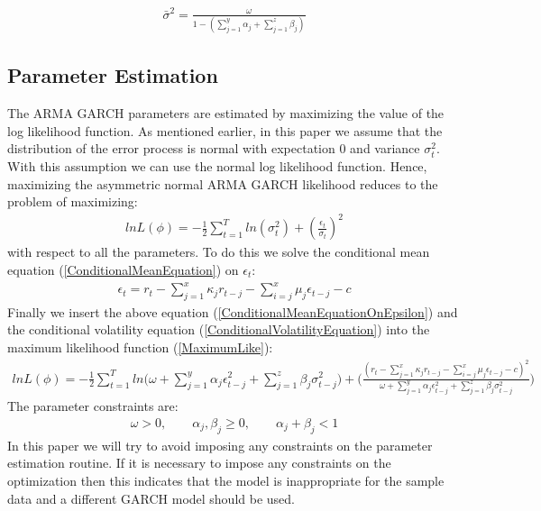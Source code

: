 \begin{align}
    \bar{\sigma}^2=\frac{\omega}{1-(\sum_{j=1}^y\alpha_j+\sum_{j=1}^z\beta_j)} \label{longTermVolatilityGARCH}
\end{align}

\subsection*{Parameter Estimation}

The ARMA GARCH parameters are estimated by maximizing the value of the log likelihood function. As mentioned earlier, in this paper we assume that the distribution of the error process is normal with expectation 0 and variance ${\sigma_t^2}$. With this assumption we can use the normal log likelihood function. Hence, maximizing the asymmetric normal ARMA GARCH likelihood reduces to the problem of maximizing:
\begin{align} 
    ln L(\phi)=-\frac{1}{2}\sum_{t=1}^T ln(\sigma_t^2)+(\frac{\epsilon_t}{\sigma_t})^2  \label{MaximumLike}
\end{align}
with respect to all the parameters. To do this we solve the conditional mean equation (\ref{ConditionalMeanEquation}) on $\epsilon_t$:
\begin{align}
    \epsilon_t=r_t-\sum_{j=1}^x\kappa_j r_{t-j}-\sum_{i=j}^x\mu_j \epsilon_{t-j}-c \label{ConditionalMeanEquationOnEpsilon}
\end{align}
Finally we insert the above equation (\ref{ConditionalMeanEquationOnEpsilon}) and the conditional volatility equation (\ref{ConditionalVolatilityEquation}) into the maximum likelihood function (\ref{MaximumLike}):
\begin{align} 
    ln L(\phi)=-\frac{1}{2}\sum_{t=1}^T ln\Big(\omega + \sum_{j=1}^y\alpha_j\epsilon_{t-j}^2+\sum_{j=1}^z\beta_j\sigma_{t-j}^2\Big)+\Big(\frac{(r_t-\sum_{j=1}^x\kappa_j r_{t-j}-\sum_{i=j}^x\mu_j \epsilon_{t-j}-c)^2}{\omega + \sum_{j=1}^y\alpha_j\epsilon_{t-j}^2+\sum_{j=1}^z\beta_j\sigma_{t-j}^2}\Big)  
\end{align}
The parameter constraints are:
\begin{align} 
    \omega>0,\quad\quad \alpha_j,\beta_j\geq0,\quad\quad \alpha_j+\beta_j<1
\end{align}
In this paper we will try to avoid imposing any constraints on the parameter estimation routine. If it is necessary to impose any constraints on the optimization then this indicates that the model is inappropriate for the sample data and a different GARCH model should be used.

